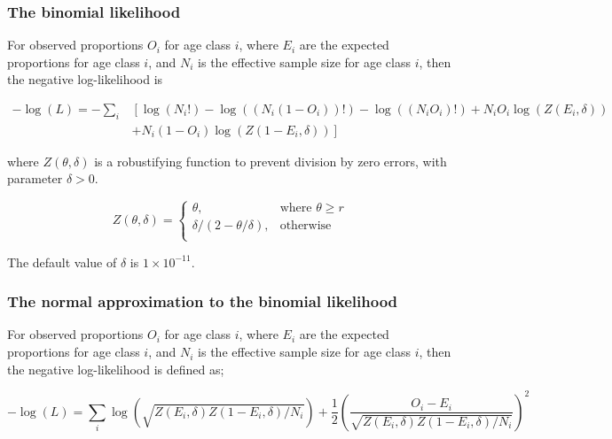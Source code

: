 \subsubsection*{The binomial likelihood}

For observed proportions $O_i$ for age class $i$, where $E_i$ are the expected proportions for age class $i$, and $N_i$ is the effective sample size for age class $i$, then the negative log-likelihood is

\begin{equation}
\begin{split}
-\log \left(L \right)= -\sum\limits_i & \left[ \right. \log \left(N_i! \right) - \log \left(\left(N_i \left(1 - O_i \right) \right)! \right) - \log \left(\left(N_i O_i \right)! \right) + N_i O_i \log \left(Z\left(E_i,\delta \right) \right) \\
&+ N_i \left(1 - O_i \right)\log \left(Z\left(1 - E_i,\delta\right) \right) \left. \right]
\end{split}
\end{equation}

where $Z \left(\theta,\delta \right)$ is a robustifying function to prevent division by zero errors, with parameter $\delta>0$.

\begin{equation}
Z \left(\theta,\delta \right) = \begin{cases}
\theta, & \text{where $\theta \ge r$} \\
\delta/\left( 2-\theta/\delta \right), & \text{otherwise} \\
\end{cases}
\end{equation}

The default value of $\delta$ is $1 \times 10^{-11}$.

\subsubsection*{The normal approximation to the binomial likelihood}

For observed proportions $O_i$ for age class $i$, where $E_i$ are the expected proportions for age class $i$, and $N_i$ is the effective sample size for age class $i$, then the negative log-likelihood is defined as;

\begin{equation}
-\log \left(L \right)= \sum\limits_i \log \left( \sqrt{Z\left(E_i,\delta \right)Z\left(1-E_i,\delta\right)/N_i} \right) + \frac{1}{2} \left( \frac{O_i-E_i}{\sqrt{Z\left(E_i,\delta\right)Z\left(1-E_i,\delta \right)/N_i}} \right)^2
\end{equation}


